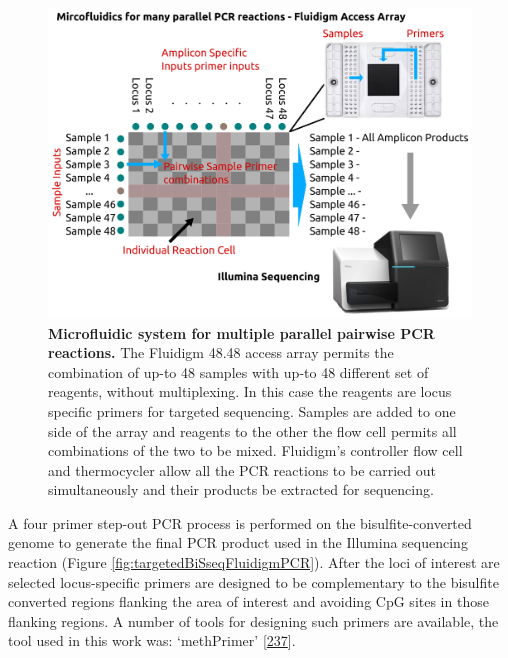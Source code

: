 \documentclass[
]{book}
\begin{document}
\begin{figure}

{\centering \includegraphics[width=0.6\linewidth]{figs/targeted_BiSseq_fluidigm_generic} 

}

\caption{\textbf{Microfluidic system for multiple parallel pairwise PCR reactions.}
The Fluidigm 48.48 access array permits the combination of up-to 48 samples with up-to 48 different set of reagents, without multiplexing. In this case the reagents are locus specific primers for targeted sequencing. Samples are added to one side of the array and reagents to the other the flow cell permits all combinations of the two to be mixed. Fluidigm's controller flow cell and thermocycler allow all the PCR reactions to be carried out simultaneously and their products be extracted for sequencing.}\label{fig:targetedBiSseqFluidigmGeneric}
\end{figure}




A four primer step-out PCR process is performed on the bisulfite-converted genome to generate the final PCR product used in the Illumina sequencing reaction (Figure \ref{fig:targetedBiSseqFluidigmPCR}).
After the loci of interest are selected locus-specific primers are designed to be complementary to the bisulfite converted regions flanking the area of interest and avoiding CpG sites in those flanking regions.
A number of tools for designing such primers are available, the tool used in this work was: `methPrimer' {[}\protect\hyperlink{ref-Li2002}{237}{]}.
\end{document}
